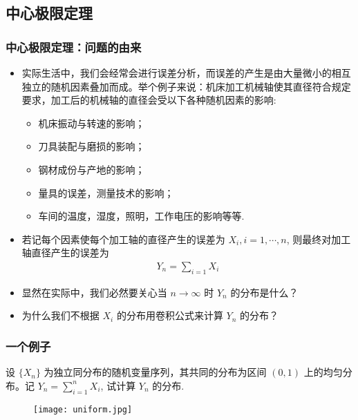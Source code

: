 \subsection{中心极限定理}
\begin{frame}
	\frametitle{中心极限定理：问题的由来}
	\begin{itemize}[<+-|alert@+>]
		\item 实际生活中，我们会经常会进行误差分析，而误差的产生是由大量微小的相互独立的随机因素叠加而成。举个例子来说：机床加工机械轴使其直径符合规定要求，加工后的机械轴的直径会受以下各种随机因素的影响:
		\begin{itemize}
			\item 机床振动与转速的影响；
			\item 刀具装配与磨损的影响；
			\item 钢材成份与产地的影响；
			\item 量具的误差，测量技术的影响；
			\item 车间的温度，湿度，照明，工作电压的影响等等.
		\end{itemize}
		\item 若记每个因素使每个加工轴的直径产生的误差为 $X_i, i=1,\cdots,n$, 则最终对加工轴直径产生的误差为
		\begin{eqnarray*}
			Y_n=\sum_{i=1}X_i
		\end{eqnarray*}
		\item 显然在实际中，我们必然要关心当 $n\rightarrow\infty$ 时 $Y_n$ 的分布是什么？
		\item 为什么我们不根据 $X_i$ 的分布用卷积公式来计算 $Y_n$ 的分布？
	\end{itemize}
\end{frame}
\begin{frame}
	\frametitle{一个例子}
	\begin{exam}
		设 $\{X_n\}$ 为独立同分布的随机变量序列，其共同的分布为区间 $(0,1)$ 上的均匀分布。记 $Y_n=\sum_{i=1}^nX_i$, 试计算 $Y_n$ 的分布.
	\end{exam}

	\pause
	\begin{figure}
		\centering
		\texttt{[image: uniform.jpg]}
	\end{figure}

\end{frame}

